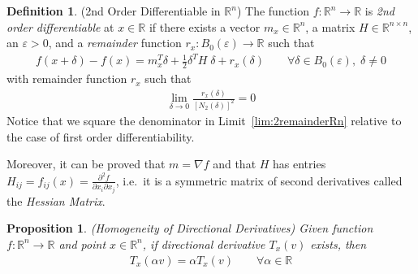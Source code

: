 \documentclass[12pt]{book}
\numberwithin{equation}{section} %
\theoremstyle{plain}
\newtheorem{prop}[thm]{Proposition}
\theoremstyle{definition}
\newtheorem{defn}[thm]{Definition}
\theoremstyle{remark}
\newcommand{\R}{\mathbb{R}}
\newcommand{\Rn}{\mathbb{R}^n}
\newcommand{\Rnn}{\mathbb{R}^{n\times n}}
\begin{document}
\begin{defn}{(2nd Order Differentiable in $\Rn$)}
\label{defn:2diffableRn}
The function $f:\Rn\rightarrow\R$ is \emph{2nd order differentiable} at
$x\in\R$ if there exists a vector $m_x\in\Rn$, a matrix $H\in\Rnn$, an
$\varepsilon>0$, and a \emph{remainder} function
$r_x:B_0(\varepsilon)\rightarrow\R$ such that
\begin{align}
  \label{eq:2diffapproxRn}
  f(x+\delta)-f(x)
  = m_x^T \delta
  + \frac{1}{2}\delta^T H \;\delta
  + r_x(\delta)
  \qquad \forall \delta\in B_0(\varepsilon), \; \delta \neq 0
\end{align}
with remainder function $r_x$ such that
\begin{align}
  \label{lim:2remainderRn}
  \lim_{\delta\rightarrow 0}
  \frac{r_x(\delta)}{[N_2(\delta)]^2}=0
\end{align}
Notice that we square the denominator in Limit~\ref{lim:2remainderRn}
relative to the case of first order differentiability.

Moreover, it can be proved that $m=\nabla f$ and that $H$ has entries
$H_{ij} = f_{ij}(x) = \frac{\partial^2 f}{\partial x_i\partial x_j}$,
i.e.\ it is a symmetric matrix of second derivatives called the
\emph{Hessian Matrix}.
\end{defn}

\begin{prop}{\emph{(Homogeneity of Directional Derivatives)}}
Given function $f:\Rn\rightarrow\R$ and point $x\in\Rn$, if directional
derivative $T_x(v)$ exists, then
\begin{align*}
  T_x(\alpha v) = \alpha T_x(v)
  \qquad\forall\alpha\in\R
\end{align*}
\end{prop}
\end{document}
